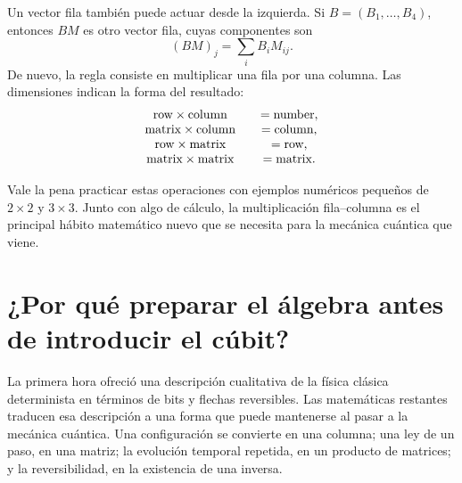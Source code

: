 Un vector fila también puede actuar desde la izquierda. Si \(B=(B_1,\ldots,B_4)\), entonces \(BM\) es otro vector fila, cuyas componentes son
\begin{equation}
  (BM)_j=\sum_i B_iM_{ij}.
  \label{eq:l01-row-times-matrix}
\end{equation}
De nuevo, la regla consiste en multiplicar una fila por una columna. Las dimensiones indican la forma del resultado:
\begin{equation}
\begin{array}{c@{\qquad}c}
\text{row}\times\text{column}&=\text{number},\\
\text{matrix}\times\text{column}&=\text{column},\\
\text{row}\times\text{matrix}&=\text{row},\\
\text{matrix}\times\text{matrix}&=\text{matrix}.
\end{array}
\label{eq:l01-shape-rules}
\end{equation}

Vale la pena practicar estas operaciones con ejemplos numéricos pequeños de \(2\times2\) y \(3\times3\). Junto con algo de cálculo, la multiplicación fila--columna es el principal hábito matemático nuevo que se necesita para la mecánica cuántica que viene.

\begin{classroomqa}
\end{classroomqa}

\section{¿Por qué preparar el álgebra antes de introducir el cúbit?}

La primera hora ofreció una descripción cualitativa de la física clásica determinista en términos de bits y flechas reversibles. Las matemáticas restantes traducen esa descripción a una forma que puede mantenerse al pasar a la mecánica cuántica. Una configuración se convierte en una columna; una ley de un paso, en una matriz; la evolución temporal repetida, en un producto de matrices; y la reversibilidad, en la existencia de una inversa.


